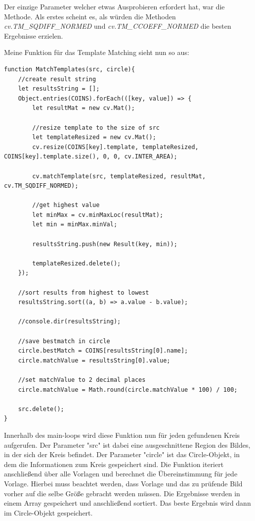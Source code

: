 Der einzige Parameter welcher etwas Ausprobieren erfordert hat, war die Methode. Als erstes scheint es, als würden die Methoden \textit{cv.TM\_SQDIFF\_NORMED} und \textit{cv.TM\_CCOEFF\_NORMED} die besten Ergebnisse erzielen. 

Meine Funktion für das Template Matching sieht nun so aus:
\begin{lstlisting}[style=JavaScript]
function MatchTemplates(src, circle){
    //create result string
    let resultsString = [];
    Object.entries(COINS).forEach(([key, value]) => {
        let resultMat = new cv.Mat();

        //resize template to the size of src
        let templateResized = new cv.Mat();
        cv.resize(COINS[key].template, templateResized, COINS[key].template.size(), 0, 0, cv.INTER_AREA);

        cv.matchTemplate(src, templateResized, resultMat, cv.TM_SQDIFF_NORMED);

        //get highest value
        let minMax = cv.minMaxLoc(resultMat);
        let min = minMax.minVal;

        resultsString.push(new Result(key, min));

        templateResized.delete();
    });

    //sort results from highest to lowest
    resultsString.sort((a, b) => a.value - b.value);

    //console.dir(resultsString);

    //save bestmatch in circle
    circle.bestMatch = COINS[resultsString[0].name];
    circle.matchValue = resultsString[0].value;

    //set matchValue to 2 decimal places
    circle.matchValue = Math.round(circle.matchValue * 100) / 100;

    src.delete();
}
\end{lstlisting}

Innerhalb des main-loops wird diese Funktion nun für jeden gefundenen Kreis aufgerufen. Der Parameter "src" ist dabei eine ausgeschnittene Region des Bildes, in der sich der Kreis befindet. Der Parameter "circle" ist das Circle-Objekt, in dem die Informationen zum Kreis gespeichert sind. Die Funktion iteriert anschließend über alle Vorlagen und berechnet die Übereinstimmung für jede Vorlage. Hierbei muss beachtet werden, dass Vorlage und das zu prüfende Bild vorher auf die selbe Größe gebracht werden müssen. Die Ergebnisse werden in einem Array gespeichert und anschließend sortiert. Das beste Ergebnis wird dann im Circle-Objekt gespeichert.

